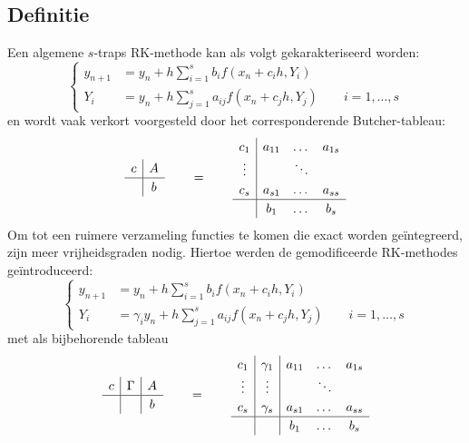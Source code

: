 \documentclass[12pt]{article}
\begin{document}
\subsection{Definitie}
Een algemene \(s\)-traps RK-methode kan als volgt gekarakteriseerd worden:
\begin{equation} \label{eq:rkdef}
    \begin{cases}
        y_{n+1}&=y_n+h\sum\limits_{i=1}^sb_if(x_n+c_ih,Y_i) \\
        Y_i&=y_n+h\sum\limits_{j=1}^sa_{ij}f(x_n+c_jh,Y_j)\qquad i=1,\dots,s
    \end{cases}
\end{equation}
en wordt vaak verkort voorgesteld door het corresponderende Butcher-tableau:
\begin{equation} \label{eq:rkbutcher}
\renewcommand\arraystretch{1.2}
\begin{array}
{c|c}
c & A \\
\hline
& b 
\end{array}\qquad=\qquad
\renewcommand\arraystretch{1.2}
\begin{array}
{c|ccc}
c_1 & a_{11} & \dots & a_{1s} \\
\vdots & & \ddots & \\
c_s & a_{s1} & \dots & a_{ss} \\
\hline
& b_1 & \dots & b_s
\end{array}
\end{equation}
Om tot een ruimere verzameling functies te komen die exact worden geïntegreerd, zijn meer vrijheidsgraden nodig. Hiertoe werden de gemodificeerde RK-methodes geïntroduceerd:
\begin{equation} \label{eq:rkmdef}
    \begin{cases}
        y_{n+1}&=y_n+h\sum\limits_{i=1}^sb_if(x_n+c_ih,Y_i) \\
        Y_i&=\gamma_iy_n+h\sum\limits_{j=1}^sa_{ij}f(x_n+c_jh,Y_j)\qquad i=1,\dots,s
    \end{cases}
\end{equation}
met als bijbehorende tableau
\begin{equation} \label{eq:rkmbutcher}
\renewcommand\arraystretch{1.2}
\begin{array}
{c|c|c}
c & \Gamma & A \\
\hline
&& b 
\end{array}\qquad=\qquad
\renewcommand\arraystretch{1.2}
\begin{array}
{c|c|ccc}
c_1 & \gamma_1 & a_{11} & \dots & a_{1s} \\
\vdots & \vdots & & \ddots & \\
c_s & \gamma_s & a_{s1} & \dots & a_{ss} \\
\hline
&& b_1 & \dots & b_s
\end{array}
\end{equation}
\end{document}
